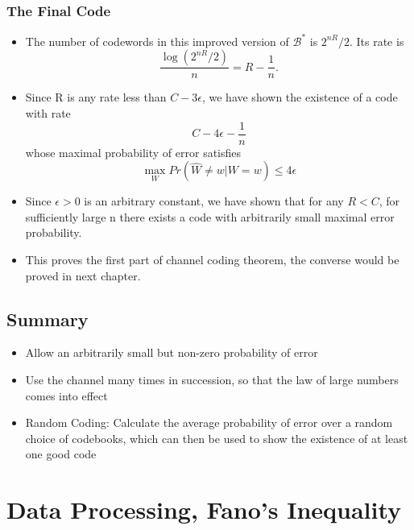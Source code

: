\documentclass[12pt]{article}
\begin{document}
\subsubsection{The Final Code}
\begin{itemize}
    \item The number of codewords in this improved version of $\mathcal{B}^*$ is $2^{nR}/2$. Its rate is 
    \[
    \frac{\log(2^{nR}/2)}{n}=R- \frac{1}{n}.
    \]
    \item Since R is any rate less than $C-3\epsilon$, we have shown the existence of a code with rate 
    \[
    C - 4\epsilon -\frac{1}{n}
    \]
    whose maximal probability of error satisfies 
    \[
    \max_{W} Pr(\hat{W}\not = w | W=w) \le 4\epsilon
    \]
    \item Since $\epsilon >0$ is an arbitrary constant, we have shown that for any $R<C$, for sufficiently large n there exists a code with arbitrarily small maximal error probability. 
    \item This proves the first part of channel coding theorem, the converse would be proved in next chapter.
\end{itemize}
\subsection{Summary}
\begin{itemize}
    \item Allow an arbitrarily small but non-zero probability of error
    \item Use the channel many times in succession, so that the law of large numbers comes into effect
    \item Random Coding: Calculate the average probability of error over a random choice of codebooks, which can then be used to show the existence of at least one good code
\end{itemize}




\newpage
\section{Data Processing, Fano's Inequality}
\end{document}
